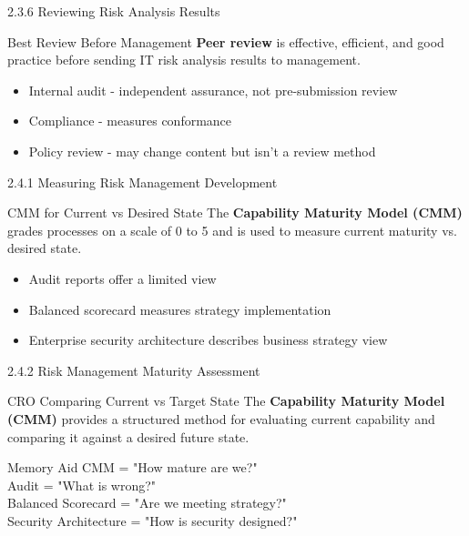 \documentclass{beamer}
\begin{document}
	\begin{frame}{2.3.6 Reviewing Risk Analysis Results}
		\begin{block}{Best Review Before Management}
			\textbf{Peer review} is effective, efficient, and good practice before sending IT risk analysis results to management.
		\end{block}
		\begin{itemize}
			\item Internal audit - independent assurance, not pre-submission review
			\item Compliance - measures conformance
			\item Policy review - may change content but isn't a review method
		\end{itemize}
	\end{frame}
	
	\begin{frame}{2.4.1 Measuring Risk Management Development}
		\begin{block}{CMM for Current vs Desired State}
			The \textbf{Capability Maturity Model (CMM)} grades processes on a scale of 0 to 5 and is used to measure current maturity vs. desired state.
		\end{block}
		\begin{itemize}
			\item Audit reports offer a limited view
			\item Balanced scorecard measures strategy implementation
			\item Enterprise security architecture describes business strategy view
		\end{itemize}
	\end{frame}
	
	\begin{frame}{2.4.2 Risk Management Maturity Assessment}
		\begin{block}{CRO Comparing Current vs Target State}
			The \textbf{Capability Maturity Model (CMM)} provides a structured method for evaluating current capability and comparing it against a desired future state.
		\end{block}
		\begin{exampleblock}{Memory Aid}
			CMM = "How mature are we?" \\
			Audit = "What is wrong?" \\
			Balanced Scorecard = "Are we meeting strategy?" \\
			Security Architecture = "How is security designed?"
		\end{exampleblock}
	\end{frame}
	
\end{document}

